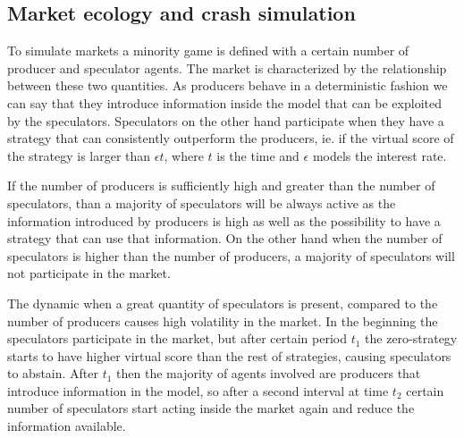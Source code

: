\subsection{Market ecology and crash simulation}

To simulate markets a minority game is defined with a certain number of producer and speculator agents.
The market is characterized by the relationship between these two quantities.
As producers behave in a deterministic fashion we can say that they introduce information inside the model that can be exploited by the speculators.
Speculators on the other hand participate when they have a strategy that can consistently outperform the  producers, ie. if the virtual score of the strategy is larger than $\epsilon t$, where $t$ is the time and $\epsilon$ models the interest rate.

If the number of producers is sufficiently high and greater than the number of speculators, than a majority of speculators will be always active as the information introduced by producers is high as well as the possibility to have a strategy that can use that information.
On the other hand when the number of speculators is higher than the number of producers, a majority of speculators will not participate in the market.

The dynamic when a great quantity of speculators is present, compared to the number of producers causes high volatility in the market.
In the beginning the speculators participate in the market, but after certain period $t_1$ the zero-strategy starts to have higher virtual score than the rest of strategies, causing speculators to abstain.
After $t_1$ then the majority of agents involved are producers that introduce information in the model, so after a second interval at time $t_2$ certain number of speculators start acting inside the market again and reduce the information available.

